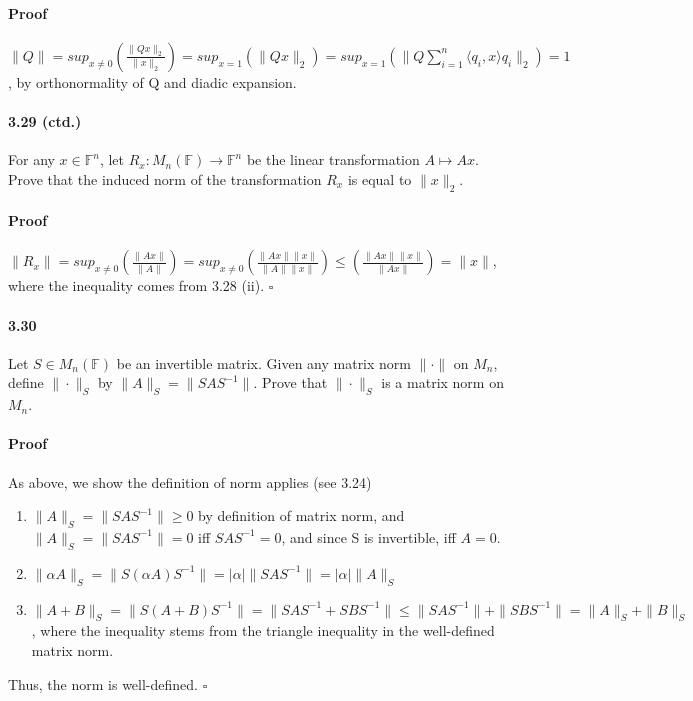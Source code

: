 \documentclass[letterpaper,12pt]{article}
\theoremstyle{definition}
\begin{document}
\paragraph{Proof} $\|Q\| 
= sup_{x \neq 0}( \frac{\| Qx \|_2}{\| x \|_2})
= sup_{x = 1}( \| Qx \|_2) 
= sup_{x = 1}( \| Q \sum_{i = 1}^n \langle q_i, x \rangle q_i \|_2)
= 1$, by orthonormality of Q and diadic expansion.

\paragraph{3.29 (ctd.)} For any $x \in \mathds{F}^n$, let $ R_x :  M_n(\mathds{F}) \rightarrow \mathds{F}^n $ be the linear transformation $ A \mapsto Ax$. Prove that the induced norm of the transformation $R_x$ is equal to $\|x\|_2$.

\paragraph{Proof} $\|R_x\| 
= sup_{x \neq 0}( \frac{\| Ax \|}{\| A \|})
= sup_{x \neq 0}( \frac{\| Ax \| \|x\|}{\| A \| \|x\|})
\le ( \frac{\| Ax \| \|x\|}{\| Ax\|})
= \|x\|$, where the inequality comes from 3.28 (ii). $\square$



\paragraph{3.30} Let $ S \in M_n(\mathds{F})$ be an invertible matrix. Given any matrix norm $\|\cdot \|$ on $M_n$, define $\|\cdot \|_S$ by $\|A \|_S = \|SAS^{-1}\|$. Prove that $\|\cdot \|_S$ is a matrix norm on $M_n$.

\paragraph{Proof} As above, we show the definition of norm applies (see 3.24)
\begin{enumerate}
\item $\|A \|_S = \|SAS^{-1}\| \ge 0$ by definition of matrix norm, and $\|A \|_S = \|SAS^{-1}\| = 0$ iff $SAS^{-1} = 0$, and since S is invertible, iff $A = 0$.
\item $\|\alpha A \|_S = \|S(\alpha A)S^{-1}\| = |\alpha|\|SAS^{-1}\| = |\alpha| \| A \|_S$
\item  $\|A + B \|_S = \|S(A + B)S^{-1}\| = \|SAS^{-1} + SBS^{-1}\| \le \|SAS^{-1}\| + \|SBS^{-1}\| = \| A \|_S + \| B \|_S$, where the inequality stems from the triangle inequality in the well-defined matrix norm.
\end{enumerate}
Thus, the norm is well-defined. $\square$
\end{document}
